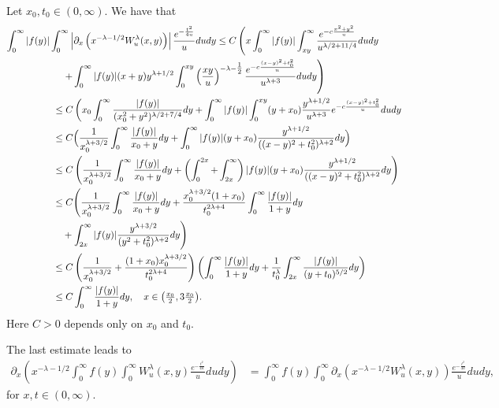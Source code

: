 \documentclass[a4paper,10pt, reqno]{amsart}
\theoremstyle{definition}
\theoremstyle{remark}
\numberwithin{equation}{section}
\begin{document}
Let $x_0,t_0\in (0,\infty)$. We have that
\begin{align*}
    \int_0^ \infty |f(y)|\int_0^\infty \left|\partial_x\left(x^{-\lambda -1/2}W_u^\lambda (x,y)\right)\right|\frac{e^{-\frac{t^2}{4u}}}{u}dudy&\leq C\left(x\int_0^\infty |f(y)|\int_{xy}^\infty \frac{e^{-c\frac{x^2+y^2}{u}}}{u^{\lambda/2+11/4}}dudy\right.\\
    &\hspace{-6cm}\left.\quad +\int_0^\infty |f(y)|(x+y)y^{\lambda+1/2}\int_0^{xy}\left(\frac{xy}{u}\right)^{-\lambda -\tfrac12}\frac{e^{-c\frac{(x-y)^2+t_0^2}{u}}}{u^{\lambda +3}}dudy\right)\\
    &\hspace{-6cm}\leq C\left(x_0\int_0^\infty \frac{|f(y)|}{(x_0^2+y^2)^{\lambda/2+7/4}}dy+\int_0^\infty|f(y)|\int_0^{xy}(y+x_0)\frac{y^{\lambda+1/2}}{u^{\lambda+3}}e^{-c\frac{(x-y)^2+t^2_0}{u}}dudy\right.\\
    &\hspace{-6cm}\le C\Big(\frac{1}{x_0^{\lambda+3/2}}\int_0^\infty \frac{|f(y)|}{x_0+y}dy+\int_0^\infty|f(y)|(y+x_0)\frac{y^{\lambda+1/2}}{((x-y)^2+t_0^2)^{\lambda+2}}dy\Big)\\
    &\hspace{-6cm}\le C\left(\frac{1}{x_0^{\lambda+3/2}}\int_0^\infty \frac{|f(y)|}{x_0+y}dy+\left(\int_0^{2x}+\int_{2x}^\infty\right)|f(y)|(y+x_0)\frac{y^{\lambda+1/2}}{((x-y)^2+t_0^2)^{\lambda+2}}dy\right)\\
    &\hspace{-6cm}\le C\Bigg(\frac{1}{x_0^{\lambda+3/2}}\int_0^\infty \frac{|f(y)|}{x_0+y}dy+\frac{x_0^{\lambda+3/2}(1+x_0)}{t_0^{2\lambda+4}}\int_0^\infty\frac{|f(y)|}{1+y}dy \\
    &\hspace{-6cm}\quad +\int_{2x}^\infty|f(y)|\frac{y^{\lambda+3/2}}{(y^2+t_0^2)^{\lambda+2}}dy\Bigg)\\
    &\hspace{-6cm}\le C\left(\frac{1}{x_0^{\lambda+3/2}}+\frac{(1+x_0)x_0^{\lambda+3/2}}{t_0^{2\lambda+4}}\right)\left(\int_0^\infty\frac{|f(y)|}{1+y}dy+\frac{1}{t_0^\lambda}\int_{2x}^\infty\frac{|f(y)|}{(y+t_0)^{5/2}}dy\right)\\
    &\hspace{-6cm}\le C\int_0^\infty\frac{|f(y)|}{1+y}dy,\quad x\in \big(\tfrac{x_0}{2},3\tfrac{x_0}{2}\big).
\end{align*}
Here $C>0$ depends only on $x_0$ and $t_0$.


The last estimate leads to
\begin{align*}
\partial_x\left(x^{-\lambda -1/2}\int_0^\infty f(y)\int_0^\infty W_u^\lambda (x,y)\frac{e^{-\frac{t^2}{4u}}}{u}dudy\right)&=\int_0^\infty f(y)\int_0^\infty \partial_x\left(x^{-\lambda -1/2}W_u^\lambda (x,y)\right)\frac{e^{-\frac{t^2}{4u}}}{u}dudy,
\end{align*}
for $x,t\in (0,\infty)$.
\end{document}
